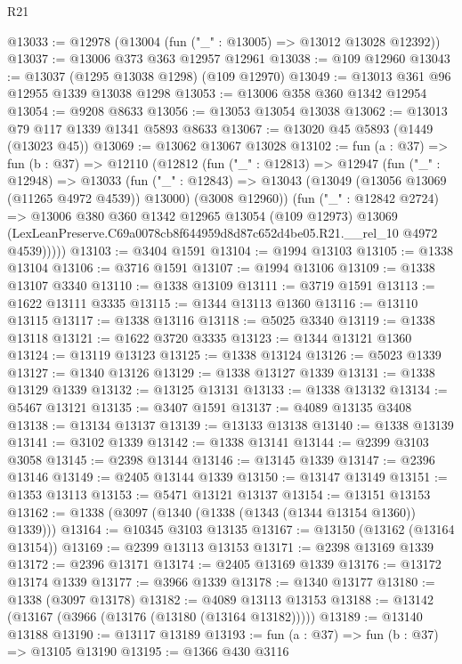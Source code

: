 \begin{lexlean}{R21}
\begin{coremodule}
@13033 := @12978 (@13004 (fun ("_" : @13005) => @13012 @13028 @12392))
@13037 := @13006 @373 @363 @12957 @12961
@13038 := @109 @12960
@13043 := @13037 (@1295 @13038 @1298) (@109 @12970)
@13049 := @13013 @361 @96 @12955 @1339 @13038 @1298
@13053 := @13006 @358 @360 @1342 @12954
@13054 := @9208 @8633
@13056 := @13053 @13054 @13038
@13062 := @13013 @79 @117 @1339 @1341 @5893 @8633
@13067 := @13020 @45 @5893 (@1449 (@13023 @45))
@13069 := @13062 @13067 @13028
@13102 := fun (a : @37) =>
  fun (b : @37) =>
  @12110
    (@12812
      (fun ("_" : @12813) =>
      @12947
        (fun ("_" : @12948) =>
        @13033
          (fun ("_" : @12843) =>
          @13043 (@13049 (@13056 @13069 (@11265 @4972 @4539)) @13000) (@3008 @12960))
          (fun ("_" : @12842 @2724) =>
          @13006
            @380
            @360
            @1342
            @12965
            @13054
            (@109 @12973)
            @13069
            (LexLeanPreserve.C69a0078cb8f644959d8d87c652d4be05.R21.__rel_10 @4972 @4539)))))
@13103 := @3404 @1591
@13104 := @1994 @13103
@13105 := @1338 @13104
@13106 := @3716 @1591
@13107 := @1994 @13106
@13109 := @1338 @13107 @3340
@13110 := @1338 @13109
@13111 := @3719 @1591
@13113 := @1622 @13111 @3335
@13115 := @1344 @13113 @1360
@13116 := @13110 @13115
@13117 := @1338 @13116
@13118 := @5025 @3340
@13119 := @1338 @13118
@13121 := @1622 @3720 @3335
@13123 := @1344 @13121 @1360
@13124 := @13119 @13123
@13125 := @1338 @13124
@13126 := @5023 @1339
@13127 := @1340 @13126
@13129 := @1338 @13127 @1339
@13131 := @1338 @13129 @1339
@13132 := @13125 @13131
@13133 := @1338 @13132
@13134 := @5467 @13121
@13135 := @3407 @1591
@13137 := @4089 @13135 @3408
@13138 := @13134 @13137
@13139 := @13133 @13138
@13140 := @1338 @13139
@13141 := @3102 @1339
@13142 := @1338 @13141
@13144 := @2399 @3103 @3058
@13145 := @2398 @13144
@13146 := @13145 @1339
@13147 := @2396 @13146
@13149 := @2405 @13144 @1339
@13150 := @13147 @13149
@13151 := @1353 @13113
@13153 := @5471 @13121 @13137
@13154 := @13151 @13153
@13162 := @1338 (@3097 (@1340 (@1338 (@1343 (@1344 @13154 @1360)) @1339)))
@13164 := @10345 @3103 @13135
@13167 := @13150 (@13162 (@13164 @13154))
@13169 := @2399 @13113 @13153
@13171 := @2398 @13169 @1339
@13172 := @2396 @13171
@13174 := @2405 @13169 @1339
@13176 := @13172 @13174 @1339
@13177 := @3966 @1339
@13178 := @1340 @13177
@13180 := @1338 (@3097 @13178)
@13182 := @4089 @13113 @13153
@13188 := @13142 (@13167 (@3966 (@13176 (@13180 (@13164 @13182)))))
@13189 := @13140 @13188
@13190 := @13117 @13189
@13193 := fun (a : @37) => fun (b : @37) => @13105 @13190
@13195 := @1366 @430 @3116

\end{coremodule}
\end{lexlean}
